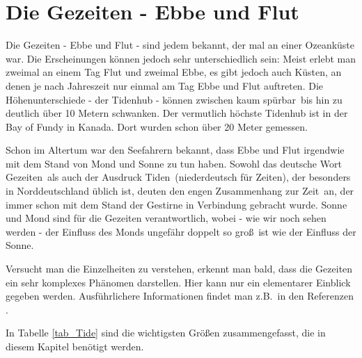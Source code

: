 

\chapter{Die Gezeiten - Ebbe und Flut}
\label{chap_Gezeiten}

Die Gezeiten - Ebbe und Flut - sind jedem bekannt, der mal an einer Ozeank\"uste
war. Die Erscheinungen k\"onnen jedoch sehr unterschiedlich sein: Meist erlebt man
zweimal an einem Tag Flut und zweimal Ebbe, es gibt jedoch auch K\"usten, an denen
je nach Jahreszeit nur einmal am Tag Ebbe und Flut auftreten. Die H\"ohenunterschiede
- der Tidenhub - 
k\"onnen zwischen \glqq kaum sp\"urbar\grqq\ bis hin zu deutlich \"uber 10 Metern schwanken.  
Der vermutlich h\"ochste Tidenhub ist in der Bay of Fundy in Kanada. 
Dort wurden schon \"uber 20 Meter gemessen. 

Schon im Altertum war den Seefahrern bekannt, dass Ebbe und Flut irgendwie mit
dem Stand von Mond und Sonne zu tun haben. Sowohl das deutsche Wort \glqq Gezeiten\grqq\
als auch der Ausdruck \glqq Tiden\grqq\ (niederdeutsch f\"ur \glqq Zeiten\grqq), 
der besonders in Norddeutschland \"ublich ist,
deuten den engen Zusammenhang zur \glqq Zeit\grqq\ an, der immer schon mit dem Stand
der Gestirne in Verbindung gebracht wurde. Sonne und Mond sind f\"ur die Gezeiten 
verantwortlich, wobei - wie wir noch sehen werden - der Einfluss des Monds ungef\"ahr 
doppelt so gro\ss\ ist wie der Einfluss der Sonne.

Versucht man die Einzelheiten zu verstehen, erkennt man bald, dass die Gezeiten ein
sehr komplexes Ph\"anomen darstellen. Hier kann nur ein elementarer Einblick gegeben werden.
Ausf\"uhrlichere Informationen findet man z.B.\ in den Referenzen \cite{Hicks,Kowalik,Parker}.

In Tabelle \ref{tab_Tide} sind die wichtigsten Gr\"o\ss en zusammengefasst, die in diesem
Kapitel ben\"otigt werden.

